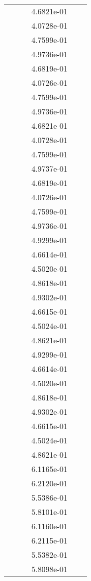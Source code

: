 \begin{xltabular}{\textwidth}{r|rS[table-format=1.3e+2]S[table-format=1.4e+2]S[table-format=1.4e+2]S[table-format=-1.5]}
&  &  & 4.6821e-01 & & \\
&  &  & 4.0728e-01 & & \\
&  &  & 4.7599e-01 & & \\
&  &  & 4.9736e-01 & & \\
&  &  & 4.6819e-01 & & \\
&  &  & 4.0726e-01 & & \\
&  &  & 4.7599e-01 & & \\
&  &  & 4.9736e-01 & & \\
&  &  & 4.6821e-01 & & \\
&  &  & 4.0728e-01 & & \\
&  &  & 4.7599e-01 & & \\
&  &  & 4.9737e-01 & & \\
&  &  & 4.6819e-01 & & \\
&  &  & 4.0726e-01 & & \\
&  &  & 4.7599e-01 & & \\
&  &  & 4.9736e-01 & & \\
&  &  & 4.9299e-01 & & \\
&  &  & 4.6614e-01 & & \\
&  &  & 4.5020e-01 & & \\
&  &  & 4.8618e-01 & & \\
&  &  & 4.9302e-01 & & \\
&  &  & 4.6615e-01 & & \\
&  &  & 4.5024e-01 & & \\
&  &  & 4.8621e-01 & & \\
&  &  & 4.9299e-01 & & \\
&  &  & 4.6614e-01 & & \\
&  &  & 4.5020e-01 & & \\
&  &  & 4.8618e-01 & & \\
&  &  & 4.9302e-01 & & \\
&  &  & 4.6615e-01 & & \\
&  &  & 4.5024e-01 & & \\
&  &  & 4.8621e-01 & & \\
&  &  & 6.1165e-01 & & \\
&  &  & 6.2120e-01 & & \\
&  &  & 5.5386e-01 & & \\
&  &  & 5.8101e-01 & & \\
&  &  & 6.1160e-01 & & \\
&  &  & 6.2115e-01 & & \\
&  &  & 5.5382e-01 & & \\
&  &  & 5.8098e-01 & & \\

\end{xltabular}
